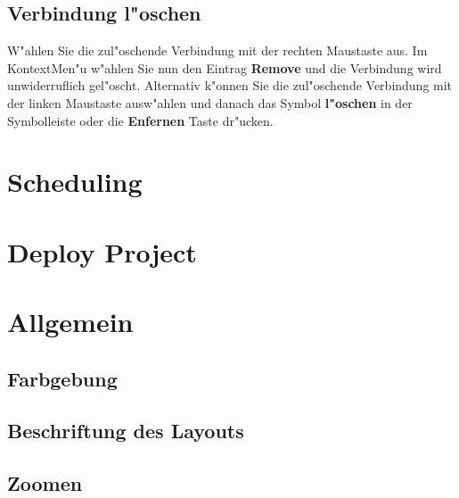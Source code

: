 \documentclass[a4paper,titlepage,12pt,ngerman]{scrbook}
\begin{document}
\subsection{Verbindung l"oschen}
W"ahlen Sie die zul"oschende Verbindung mit der rechten Maustaste aus. Im KontextMen"u w"ahlen Sie nun den Eintrag {\bf Remove} und die Verbindung wird unwiderruflich gel"oscht.
Alternativ k"onnen Sie die zul"oschende Verbindung mit der linken Maustaste ausw"ahlen und danach das Symbol {\bf l"oschen} in der Symbolleiste oder die {\bf Enfernen} Taste dr"ucken.


\section{Scheduling}
\section{Deploy Project}
\section{Allgemein}
\subsection{Farbgebung}
\subsection{Beschriftung des Layouts}
\subsection{Zoomen}
\end{document}
